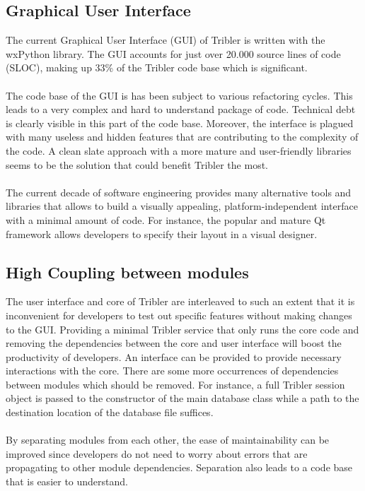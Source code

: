 \subsection{Graphical User Interface}
The current Graphical User Interface (GUI) of Tribler is written with the wxPython library. The GUI accounts for just over 20.000 source lines of code (SLOC), making up 33\% of the Tribler code base which is significant.\\\\
The code base of the GUI is has been subject to various refactoring cycles. This leads to a very complex and hard to understand package of code. Technical debt is clearly visible in this part of the code base. Moreover, the interface is plagued with many useless and hidden features that are contributing to the complexity of the code. A clean slate approach with a more mature and user-friendly libraries seems to be the solution that could benefit Tribler the most.\\\\
The current decade of software engineering provides many alternative tools and libraries that allows to build a visually appealing, platform-independent interface with a minimal amount of code. For instance, the popular and mature Qt framework allows developers to specify their layout in a visual designer.

\subsection{High Coupling between modules}
The user interface and core of Tribler are interleaved to such an extent that it is inconvenient for developers to test out specific features without making changes to the GUI. Providing a minimal Tribler service that only runs the core code and removing the dependencies between the core and user interface will boost the productivity of developers. An interface can be provided to provide necessary  interactions with the core. There are some more occurrences of dependencies between modules which should be removed. For instance, a full Tribler session object is passed to the constructor of the main database class while a path to the destination location of the database file suffices.\\\\
By separating modules from each other, the ease of maintainability can be improved since developers do not need to worry about errors that are propagating to other module dependencies. Separation also leads to a code base that is easier to understand.

